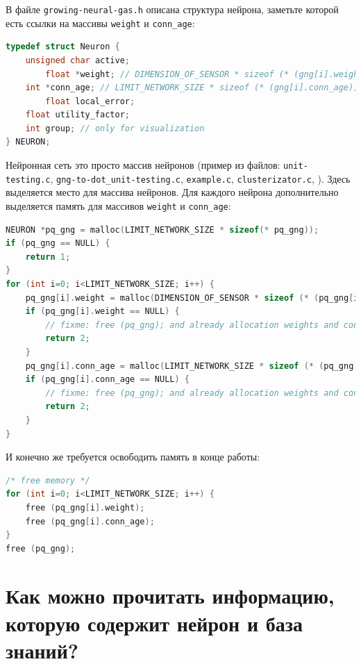 \documentclass[unicode, 12pt, a4paper,oneside,fleqn]{article}
\begin{document}
В файле \verb'growing-neural-gas.h' описана структура нейрона,
заметьте которой есть ссылки на массивы \verb'weight' и
\verb'conn_age':

\begin{lstlisting}[language=C,
  caption={Описание структуры нейрона},
  captionpos=b,
  label={nueron:code}]
typedef struct Neuron {
	unsigned char active;
        float *weight; // DIMENSION_OF_SENSOR * sizeof (* (gng[i].weight))
	int *conn_age; // LIMIT_NETWORK_SIZE * sizeof (* (gng[i].conn_age))
        float local_error;
	float utility_factor;
	int group; // only for visualization
} NEURON;
\end{lstlisting}


Нейронная сеть это просто массив нейронов (пример из файлов:
\verb'unit-testing.c', \verb'gng-to-dot_unit-testing.c',
\verb'example.c', \verb'clusterizator.c', ).  Здесь выделяется место
для массива нейронов.  Для каждого нейрона дополнительно выделяется
память для массивов \verb'weight' и \verb'conn_age':

\begin{lstlisting}[language=C,
  caption={Выделение памяти},
  captionpos=b,
  label={malloc:code}]
NEURON *pq_gng = malloc(LIMIT_NETWORK_SIZE * sizeof(* pq_gng));
if (pq_gng == NULL) {
	return 1;
}
for (int i=0; i<LIMIT_NETWORK_SIZE; i++) {
	pq_gng[i].weight = malloc(DIMENSION_OF_SENSOR * sizeof (* (pq_gng[i].weight)));
	if (pq_gng[i].weight == NULL) {
		// fixme: free (pq_gng); and already allocation weights and conn_ages
		return 2;
	}
	pq_gng[i].conn_age = malloc(LIMIT_NETWORK_SIZE * sizeof (* (pq_gng[i].conn_age)));
	if (pq_gng[i].conn_age == NULL) {
		// fixme: free (pq_gng); and already allocation weights and conn_ages
		return 2;
	}
}
\end{lstlisting}

И конечно же требуется освободить память в конце работы:
\begin{lstlisting}[language=C,
  caption={Освобождение памяти},
  captionpos=b,
  label={free:code}]
/* free memory */
for (int i=0; i<LIMIT_NETWORK_SIZE; i++) {
	free (pq_gng[i].weight);
	free (pq_gng[i].conn_age);
}
free (pq_gng);
\end{lstlisting}



\clearpage
\section{Как можно прочитать информацию, которую содержит нейрон и база знаний?}
\end{document}
